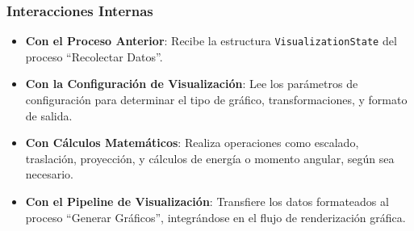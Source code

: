 \subsubsection{Interacciones Internas}
\begin{itemize}
    \item \textbf{Con el Proceso Anterior}: Recibe la estructura \texttt{VisualizationState} del proceso ``Recolectar Datos''.
    \item \textbf{Con la Configuración de Visualización}: Lee los parámetros de configuración para determinar el tipo de gráfico, transformaciones, y formato de salida.
    \item \textbf{Con Cálculos Matemáticos}: Realiza operaciones como escalado, traslación, proyección, y cálculos de energía o momento angular, según sea necesario.
    \item \textbf{Con el Pipeline de Visualización}: Transfiere los datos formateados al proceso ``Generar Gráficos'', integrándose en el flujo de renderización gráfica.
\end{itemize}


